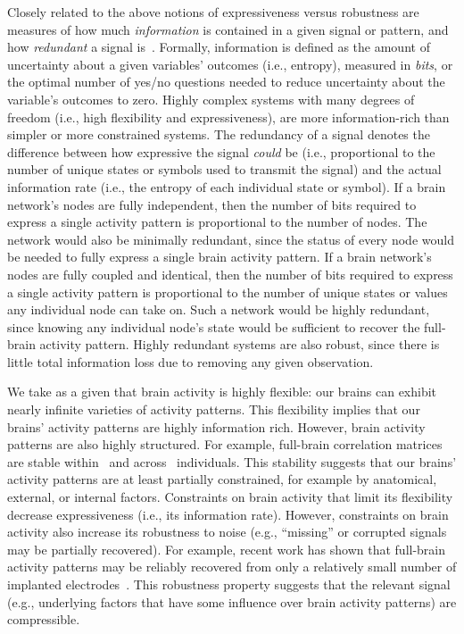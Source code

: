 \documentclass[english, 11pt]{article}
\begin{document}
Closely related to the above notions of expressiveness versus robustness are
measures of how much \textit{information} is contained in a given signal or
pattern, and how \textit{redundant} a signal is~\citep{Shan48}. Formally,
information is defined as the amount of uncertainty about a given variables'
outcomes (i.e., entropy), measured in \textit{bits}, or the optimal number of
yes/no questions needed to reduce uncertainty about the variable's outcomes to
zero. Highly complex systems with many degrees of freedom (i.e., high
flexibility and expressiveness), are more information-rich than simpler or more
constrained systems. The redundancy of a signal denotes the difference between
how expressive the signal \textit{could} be (i.e., proportional to the number
of unique states or symbols used to transmit the signal) and the actual
information rate (i.e., the entropy of each individual state or symbol). If a
brain network's nodes are fully independent, then the number of bits required
to express a single activity pattern is proportional to the number of nodes.
The network would also be minimally redundant, since the status of every node
would be needed to fully express a single brain activity pattern. If a brain
network's nodes are fully coupled and identical, then the number of bits
required to express a single activity pattern is proportional to the number of
unique states or values any individual node can take on. Such a network would
be highly redundant, since knowing any individual node's state would be
sufficient to recover the full-brain activity pattern. Highly redundant systems
are also robust, since there is little total information loss due to removing
any given observation.

We take as a given that brain activity is highly flexible: our brains can
exhibit nearly infinite varieties of activity patterns. This flexibility
implies that our brains' activity patterns are highly information rich. However,
brain activity patterns are also highly structured. For example, full-brain
correlation matrices are stable within~\citep{FinnEtal15, FinnEtal17,
GratEtal18} and across~\citep{YeoEtal11, GlerEtal12, GratEtal18, ColeEtal14}
individuals. This stability suggests that our brains' activity patterns are at
least partially constrained, for example by anatomical, external, or internal
factors. Constraints on brain activity that limit its flexibility decrease
expressiveness (i.e., its information rate). However, constraints on brain
activity also increase its robustness to noise (e.g., ``missing'' or corrupted
signals may be partially recovered). For example, recent work has shown that
full-brain activity patterns may be reliably recovered from only a relatively
small number of implanted electrodes~\citep{OwenEtal20, ScanEtal21}. This
robustness property suggests that the relevant signal (e.g., underlying factors
that have some influence over brain activity patterns) are compressible.
\end{document}

